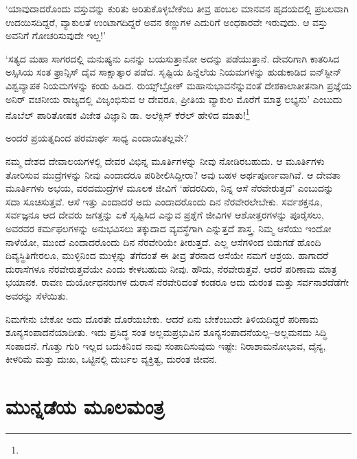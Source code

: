 ‘ಯಾವುದಾದರೊಂದು ವಸ್ತುವನ್ನು ಕುರಿತು ಅರಿತುಕೊಳ್ಳಬೇಕೆಂಬ ತೀವ್ರ ಹಂಬಲ ಮಾನವನ ಹೃದಯದಲ್ಲಿ ಪ್ರಬಲವಾಗಿ ಉದಯಿಸದಿದ್ದರೆ, ವ್ಯಾಕುಲತೆ ಉಂಟಾಗದಿದ್ದರೆ ಅವನ ಕಣ್ಣುಗಳ ಎದುರಿಗೆ ಅಂಧಕಾರವೇ ಇರುವುದು. ಆ ವಸ್ತು ಅವನಿಗೆ ಗೋಚರಿಸುವುದೇ ಇಲ್ಲ!’

‘ಸತ್ಯದ ಮಹಾ ಸಾಗರದಲ್ಲಿ ಮನುಷ್ಯನು ಏನನ್ನು ಬಯಸುತ್ತಾನೋ ಅದನ್ನು ಪಡೆಯುತ್ತಾನೆ. ದೇವರಿಗಾಗಿ ಕಾತರಿಸಿದ ಅಸ್ಸಿಸಿಯ ಸಂತ ಫ್ರಾನ್ಸಿಸ್ ದೈವ ಸಾಕ್ಷಾತ್ಕಾರ ಪಡೆದ. ಸೃಷ್ಟಿಯ ಹಿನ್ನೆಲೆಯ ನಿಯಮಗಳನ್ನು ಹುಡುಕಾಡಿದ ಐನ್​ಸ್ಟೀನ್ ವಿಶ್ವವ್ಯಾಪಕ ನಿಯಮಗಳನ್ನು ಕಂಡು ಹಿಡಿದ. ರುಯ್ಸ್​ಬ್ರೋಕ್ ಮಹಾನುಭಾವನೆನ್ನುವಂತೆ ದೇಶಕಾಲಾತೀತನಾಗಿ ಪ್ರಜ್ಞೆಯ ಅನಿರ್ ವಚನೀಯ ರಾಜ್ಯದಲ್ಲಿ ವಿಜೃಂಭಿಸುವ ಆ ದೇವರೂ, ಪ್ರೀತಿಯ ವ್ಯಾಕುಲ ಮೊರೆಗೆ ಮಾತ್ರ ಲಭ್ಯನು’ ಎಂಬುದು ನೊಬೆಲ್ ಪಾರಿತೋಷಕ ವಿಜೇತ ವಿಜ್ಞಾನಿ ಡಾ. ಅಲೆಕ್ಸಿಸ್ ಕೆರೆಲ್​ ಹೇಳಿದ ಮಾತು!\footnote{\hfill{}}

ಅಂದರೆ ಪ್ರಯತ್ನದಿಂದ ಪರಮಾರ್ಥ ಸಾಧ್ಯ ಎಂದಾಯಿತಲ್ಲವೇ?

ನಮ್ಮ ದೇಶದ ದೇವಾಲಯಗಳಲ್ಲಿ ದೇವರ ವಿಭಿನ್ನ ಮೂರ್ತಿಗಳನ್ನು ನೀವು ನೋಡಿರಬಹುದು. ಆ ಮೂರ್ತಿಗಳು ತೋರಿಸುವ ಮುದ್ರೆಗಳನ್ನು ನೀವು ಎಂದಾದರೂ ಪರಿಶೀಲಿಸಿದ್ದೀರಾ? ಅವು ಬಹಳ ಅರ್ಥಪೂರ್ಣವಾಗಿವೆ. ಆ ದೇವತಾ ಮೂರ್ತಿಗಳು ಅಭಯ, ವರದಮುದ್ರೆಗಳ ಮೂಲಕ ಜೀವಿಗೆ ‘ಹೆದರದಿರು, ನಿನ್ನ ಆಸೆ ನೆರವೇರುತ್ತದೆ’ ಎಂಬುದನ್ನು ಸದಾ ಸೂಚಿಸುತ್ತವೆ. ಆಸೆ ಇತ್ತು ಎಂದಾದರೆ ಅದು ಎಂದಾದರೊಂದು ದಿನ ನೆರವೇರಲೇಬೇಕು. ಸರ್ವಶಕ್ತನೂ, ಸರ್ವಜ್ಞನೂ ಆದ ದೇವರು ಜಗತ್ತನ್ನು ಏಕೆ ಸೃಷ್ಟಿಸಿದ ಎನ್ನುವ ಪ್ರಶ್ನೆಗೆ ಜೀವಿಗಳ ಆಶೋತ್ತರ\-ಗಳನ್ನು ಪೂರೈಸಲು, ಅವರವರ ಕರ್ಮಫಲಗಳನ್ನು ಅನುಭವಿಸಲು ತಕ್ಕುದಾದ ವ್ಯವಸ್ಥೆಗಾಗಿ ಎನ್ನುತ್ತದೆ ಶಾಸ್ತ್ರ. ನಿಮ್ಮ ಆಸೆಯು ಇಂದೋ ನಾಳೆಯೋ, ಮುಂದೆ ಎಂದಾದರೊಂದು ದಿನ ನೆರವೇರಿಯೇ ತೀರುತ್ತದೆ. ಎಲ್ಲ ಆಸೆಗಳಿಂದ ಬಿಡುಗಡೆ ಹೊಂದಿ ದಿವ್ಯಸ್ಥಿತಿಗೇರಲೂ, ಮುಳ್ಳಿನಿಂದ ಮುಳ್ಳನ್ನು ತೆಗೆದಂತೆ ಈ ತೀವ್ರ ತೆರನಾದ ಆಸೆಯೇ ನಮಗೆ ಆಶ್ರಯ. ಹಾಗಾದರೆ ದುರಾಸೆಗಳೂ ನೆರವೇರುತ್ತವೆಯೇ ಎಂದು ಕೇಳಬಹುದು ನೀವು. ಹೌದು, ನೆರವೇರುತ್ತವೆ. ಆದರೆ ಪರಿಣಾಮ ಮಾತ್ರ ಭಯಾನಕ. ರಾವಣ ದುರ್ಯೋಧನರುಗಳ ದುರಾಸೆ ನೆರವೇರಿದಂತೆ ಕಂಡರೂ ಅದು ದುರಂತ ಮತ್ತು ಸರ್ವನಾಶದೆಡೆಗೇ ಅವರನ್ನು ಸೆಳೆಯಿತು.

ನಿಮಗೇನು ಬೇಕೋ ಅದು ದೊರತೇ ದೊರೆಯಬೇಕು. ಆದರೆ ಏನು ಬೇಕೆಂಬುದೇ ತಿಳಿಯದಿದ್ದರೆ ಪರಿಣಾಮ ಶೂನ್ಯಸಂಪಾದನೆಯಾದೀತು. ಇದು ಪ್ರಸಿದ್ಧ ಸಂತ ಅಲ್ಲಮಪ್ರಭುವಿನ ಶೂನ್ಯಸಂಪಾದನೆಯಲ್ಲ–ಅಲ್ಲಮನದು ಸಿದ್ಧಿ ಸಂಪಾದನೆ. ಗೊತ್ತು ಗುರಿ ಇಲ್ಲದ ಬದುಕಿನಿಂದ ನಾವು ಸಂಪಾದಿಸುವುದು ಇಷ್ಟೇ: ನಿರಾಶಾಮನೋಭಾವ, ದೈನ್ಯ, ಕೀಳರಿಮೆ ಮತ್ತು ದುಃಖ, ಒಟ್ಟಿನಲ್ಲಿ ದುರ್ಬಲ ವ್ಯಕ್ತಿತ್ವ, ದುರಂತ ಜೀವನ.


\section*{ಮುನ್ನಡೆಯ ಮೂಲಮಂತ್ರ}

